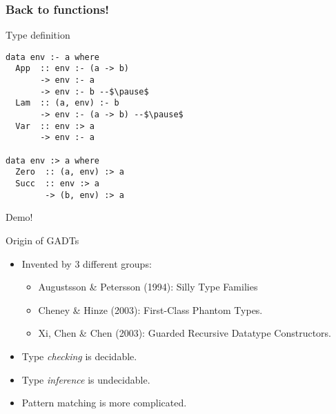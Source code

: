 \documentclass[pdftex,aspectratio=169]{beamer}
\begin{document}
\begin{frame}[fragile]
  \frametitle{Back to functions!}
  \begin{block}{Type definition}
  \begin{lstlisting}
data env :- a where
  App  :: env :- (a -> b) 
       -> env :- a 
       -> env :- b --$\pause$
  Lam  :: (a, env) :- b
       -> env :- (a -> b) --$\pause$
  Var  :: env :> a 
       -> env :- a

data env :> a where
  Zero  :: (a, env) :> a
  Succ  :: env :> a 
        -> (b, env) :> a
\end{lstlisting}
\end{block}\pause
Demo!
\end{frame}

\begin{frame}{Origin of GADTs}
  \begin{itemize}
  \item<1->
    Invented by 3 different groups:
    \begin{itemize}
    \item Augustsson \& Petersson (1994): Silly Type Families
    \item Cheney \& Hinze (2003): First-Class Phantom Types.
    \item Xi, Chen \& Chen (2003): Guarded Recursive Datatype Constructors.
    \end{itemize}
  \item<2-> Type \emph{checking} is decidable.
  \item<3-> Type \emph{inference} is undecidable.
  \item<4-> Pattern matching is more complicated.
  \end{itemize}
  
\end{frame}
\end{document}
